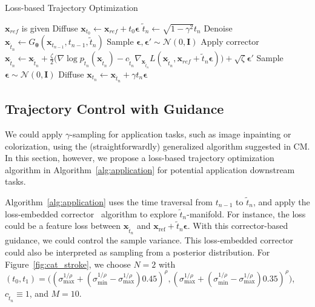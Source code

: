 \documentclass{article} \usepackage{iclr2024_coNFErence,times}
\theoremstyle{definition}
\theoremstyle{remark}
\begin{document}
\begin{algorithm}[H]
    \centering
    \caption{Loss-based Trajectory Optimization}\label{alg:application}
    \begin{algorithmic}[1]
    \State $\mathbf{x}_{ref}$ is given
    \State Diffuse $\mathbf{x}_{t_{0}}\leftarrow\mathbf{x}_{ref}+t_{0}\bm{\epsilon}$
        \State $\tilde{t}_{n}\leftarrow\sqrt{1-\gamma^{2}}t_{n}$
        \State Denoise $\mathbf{x}_{\tilde{t}_{n}}\leftarrow G_{\bm{\theta}}(\mathbf{x}_{t_{n-1}},t_{n-1},\tilde{t}_{n})$
        \State Sample $\bm{\epsilon},\bm{\epsilon}'\sim\mathcal{N}(0,\mathbf{I})$
        \State Apply corrector $\mathbf{x}_{\tilde{t}_{n}}\leftarrow \mathbf{x}_{\tilde{t}_{n}}+\frac{\zeta}{2}\Big(\nabla\log{p_{\tilde{t}_{n}}(\mathbf{x}_{\tilde{t}_{n}})}-c_{\tilde{t}_{n}}\nabla_{\mathbf{x}_{\tilde{t}_{n}}}L(\mathbf{x}_{\tilde{t}_{n}},\mathbf{x}_{ref}+\tilde{t}_{n}\bm{\epsilon})\Big)+\sqrt{\zeta}\bm{\epsilon}'$
        \EndFor
        \State Sample $\bm{\epsilon}\sim\mathcal{N}(0,\mathbf{I})$
        \State Diffuse $\mathbf{x}_{t_{n}}\leftarrow\mathbf{x}_{\hat{t}_{n}}+\gamma t_{n}\bm{\epsilon}$
        \EndFor
    \end{algorithmic}
\end{algorithm}

\subsection{Trajectory Control with Guidance}\label{subsec:traj_control}


We could apply $\gamma$-sampling for application tasks, such as image inpainting or colorization, using the (straightforwardly) generalized algorithm suggested in CM. In this section, however, we propose a loss-based trajectory optimization algorithm in Algorithm~\ref{alg:application} for potential application downstream tasks.

Algorithm~\ref{alg:application} uses the time traversal from $t_{n-1}$ to $\tilde{t}_{n}$, and apply the loss-embedded corrector~\citep{song2020score} algorithm to explore $\tilde{t}_{n}$-manifold. For instance, the loss could be a feature loss between $\mathbf{x}_{\tilde{t}_{n}}$ and $\mathbf{x}_{\text{ref}}+\tilde{t}_{n}\bm{\epsilon}$. With this corrector-based guidance, we could control the sample variance. This loss-embedded corrector could also be interpreted as sampling from a posterior distribution. For Figure~\ref{fig:cat_stroke}, we choose $N=2$ with $(t_{0},t_{1})=\big((\sigma_{\text{max}}^{1/\rho}+(\sigma_{\text{min}}^{1/\rho}-\sigma_{\text{max}}^{1/\rho})0.45)^{\rho}, (\sigma_{\text{max}}^{1/\rho}+(\sigma_{\text{min}}^{1/\rho}-\sigma_{\text{max}}^{1/\rho})0.35)^{\rho}\big)$, $c_{\tilde{t}_{n}}\equiv 1$, and $M=10$.
\end{document}

